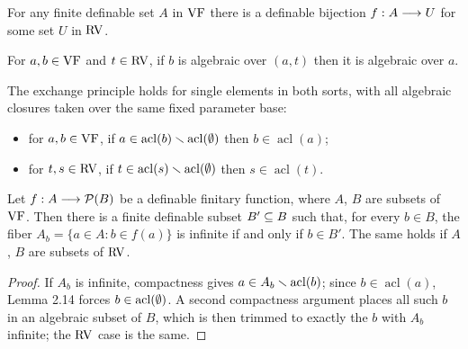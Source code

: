 \setcounter{theorem}{11}
\begin{lemma}
\label{finite-VF-project-RV}
\leanok
{}
For any finite definable set $A$ in $\mathrm{VF}$ there is a definable bijection $f : A \longrightarrow U$ for some set $U$ in $\mathrm{RV}$.
\end{lemma}

\setcounter{theorem}{12}
\begin{lemma}
\label{dcl-to-ac}
\leanok
For $a, b \in \mathrm{VF}$ and $t \in \mathrm{RV}$, if $b$ is algebraic over $(a,t)$ then it is algebraic over $a$.
\end{lemma}

\setcounter{theorem}{13}
\begin{lemma}
\label{exchange}
\leanok
The exchange principle holds for single elements in both sorts, with all algebraic closures taken over the same fixed parameter base:
\begin{itemize}
\item for $a, b \in \mathrm{VF}$, if $a \in \operatorname{acl}(b) \smallsetminus \operatorname{acl}(\emptyset)$ then $b \in \operatorname{acl}(a)$;
\item for $t, s \in \mathrm{RV}$, if $t \in \operatorname{acl}(s) \smallsetminus \operatorname{acl}(\emptyset)$ then $s \in \operatorname{acl}(t)$.
\end{itemize}
\end{lemma}

\setcounter{theorem}{14}
\begin{lemma}
\label{finite-fib-def}
\leanok
{}
Let $f : A \longrightarrow \mathcal{P}(B)$ be a definable finitary function, where $A$, $B$ are subsets of $\mathrm{VF}$. Then there is a finite definable subset $B' \subseteq B$ such that, for every $b \in B$, the fiber $A_b = \{a \in A : b \in f(a)\}$ is infinite if and only if $b \in B'$. The same holds if $A$, $B$ are subsets of $\mathrm{RV}$.
\end{lemma}

\begin{proof}
\leanok
If $A_b$ is infinite, compactness gives $a \in A_b \smallsetminus \operatorname{acl}(b)$; since $b \in \operatorname{acl}(a)$, Lemma 2.14 forces $b \in \operatorname{acl}(\emptyset)$. A second compactness argument places all such $b$ in an algebraic subset of $B$, which is then trimmed to exactly the $b$ with $A_b$ infinite; the $\mathrm{RV}$ case is the same.
\end{proof}

